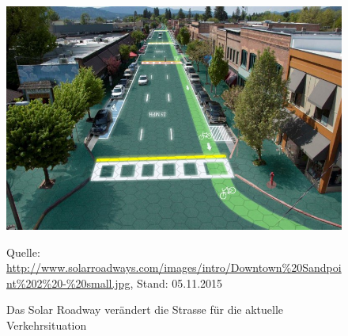 \begin{figure}[h]
  \centering
  \includegraphics[scale=0.61]{98_Bilder/03_Marktsegmente/solar_roadway_00}
  \caption[Solar Roadway, dynamische Strasse]{Das Solar Roadway verändert die Strasse für die aktuelle Verkehrsituation}
  \footnotesize Quelle: \url{http://www.solarroadways.com/images/intro/Downtown%20Sandpoint%202%20-%20small.jpg}, Stand: 05.11.2015
\end{figure}
\newpage
